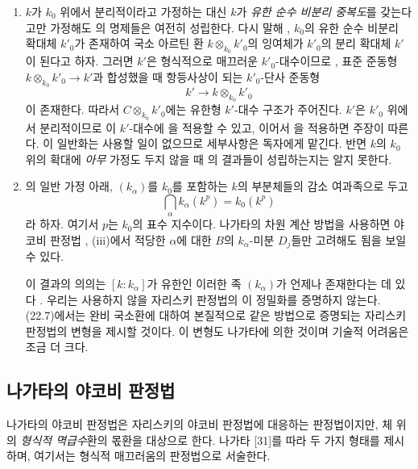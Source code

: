 \begin{remark}[22.6.9]
\label{0.22.6.9-ko}
\begin{enumerate}
  \item[\rm(i)] $k$가 $k_0$ 위에서 분리적이라고 가정하는 대신
  $k$가 \emph{유한 순수 비분리 중복도}를 갖는다고만 가정해도
  의 명제들은 여전히 성립한다. 다시 말해
  , $k_0$의 유한 순수 비분리 확대체 $k'_0$가
  존재하여 국소 아르틴 환 $k\otimes_{k_0}k'_0$의 잉여체가
  $k'_0$의 분리 확대체 $k'$이 된다고 하자. 그러면
  $k'$은 형식적으로 매끄러운 $k'_0$-대수이므로
  , 표준 준동형
  $k\otimes_{k_0}k'_0\longrightarrow k'$과 합성했을 때 항등사상이
  되는 $k'_0$-단사 준동형
  \[
    k'\longrightarrow k\otimes_{k_0}k'_0
  \]
  이 존재한다. 따라서 $C\otimes_{k_0}k'_0$에는 유한형 $k'$-대수
  구조가 주어진다. $k'$은 $k'_0$ 위에서 분리적이므로 이
  $k'$-대수에 을 적용할 수 있고, 이어서
  을 적용하면 주장이 따른다. 이 일반화는 사용할
  일이 없으므로 세부사항은 독자에게 맡긴다. 반면 $k$의 $k_0$ 위의
  확대에 \emph{아무} 가정도 두지 않을 때
  의 결과들이 성립하는지는 알지 못한다.
  \item[\rm(ii)] 의 일반 가정 아래,
  $(k_\alpha)$를 $k_0$를 포함하는 $k$의 부분체들의 감소 여과족으로
  두고
  \[
    \bigcap_\alpha k_\alpha(k^p)=k_0(k^p)
  \]
  라 하자. 여기서 $p$는 $k_0$의 표수 지수이다. 나가타의 차원 계산
  방법을 사용하면 야코비 판정법 , (iii)에서
  적당한 $\alpha$에 대한 $B$의 $k_\alpha$-미분 $D_j$들만
  고려해도 됨을 보일 수 있다.


  이 결과의 의의는 $[k:k_\alpha]$가 유한인 이러한 족
  $(k_\alpha)$가 언제나 존재한다는 데 있다 .
  우리는 사용하지 않을 자리스키 판정법의 이 정밀화를 증명하지
  않는다. (22.7)에서는 완비 국소환에 대하여 본질적으로
  같은 방법으로 증명되는 자리스키 판정법의 변형을 제시할 것이다.
  이 변형도 나가타에 의한 것이며 기술적 어려움은 조금 더 크다.
\end{enumerate}
\end{remark}

\subsection{나가타의 야코비 판정법}
\label{subsection:0.22.7-ko}

\begin{env}[22.7.1]
\label{0.22.7.1-ko}
나가타의 야코비 판정법은 자리스키의 야코비 판정법에 대응하는
판정법이지만, 체 위의 \emph{형식적 멱급수}환의 몫환을 대상으로 한다.
나가타 [31]를 따라 두 가지 형태를 제시하며, 여기서는 형식적
매끄러움의 판정법으로 서술한다.
\end{env}

